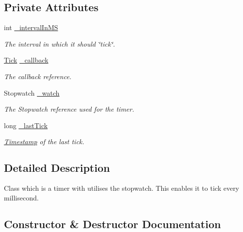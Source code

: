 \subsection*{Private Attributes}
\begin{DoxyCompactItemize}
\item 
int \hyperlink{class_web_analyzer_1_1_util_1_1_stopwatch_timer_a22d6806aa912ee0bfcd6e2071c45caac}{\+\_\+interval\+In\+M\+S}
\begin{DoxyCompactList}\small\item\em The interval in which it should \char`\"{}tick\char`\"{}. \end{DoxyCompactList}\item 
\hyperlink{class_web_analyzer_1_1_util_1_1_stopwatch_timer_a5670fcf49435ed5d241abd0617c9f607}{Tick} \hyperlink{class_web_analyzer_1_1_util_1_1_stopwatch_timer_a54307d4a1466d1d52cf487d3e9988105}{\+\_\+callback}
\begin{DoxyCompactList}\small\item\em The callback reference. \end{DoxyCompactList}\item 
Stopwatch \hyperlink{class_web_analyzer_1_1_util_1_1_stopwatch_timer_a0e339fc5d72427474cd3eedad231f279}{\+\_\+watch}
\begin{DoxyCompactList}\small\item\em The Stopwatch reference used for the timer. \end{DoxyCompactList}\item 
long \hyperlink{class_web_analyzer_1_1_util_1_1_stopwatch_timer_a598514e43384c8e3728a6ea751a359d8}{\+\_\+last\+Tick}
\begin{DoxyCompactList}\small\item\em \hyperlink{class_web_analyzer_1_1_util_1_1_timestamp}{Timestamp} of the last tick. \end{DoxyCompactList}\end{DoxyCompactItemize}


\subsection{Detailed Description}
Class which is a timer with utilises the stopwatch. This enables it to tick every millisecond. 



\subsection{Constructor \& Destructor Documentation}
\hypertarget{class_web_analyzer_1_1_util_1_1_stopwatch_timer_a1b411ff5e4314d1960220119bdcfee9f}{}

